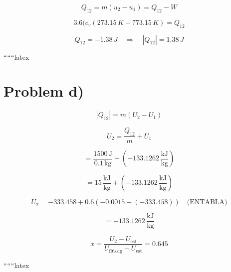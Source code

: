 \[
Q_{12} = m (u_2 - u_1) = Q_{12} - W
\]

\[
3.6 (c_v (273.15\,K - 773.15\,K) = Q_{12}
\]

\[
Q_{12} = -1.38\,J \quad \Rightarrow \quad |Q_{12}| = 1.38\,J
\]

``````latex


\section*{Problem d)}

\begin{equation*}
|Q_{12}| = m (U_2 - U_1)
\end{equation*}

\begin{equation*}
U_2 = \frac{Q_{12}}{m} + U_1
\end{equation*}

\begin{equation*}
= \frac{1500 \, \text{J}}{0.1 \, \text{kg}} + (-133.1262 \, \frac{\text{kJ}}{\text{kg}})
\end{equation*}

\begin{equation*}
= 15 \, \frac{\text{kJ}}{\text{kg}} + (-133.1262 \, \frac{\text{kJ}}{\text{kg}})
\end{equation*}

\begin{equation*}
U_2 = -333.458 + 0.6 \left( -0.0015 - (-333.458) \right) \quad \text{(ENTABLA)}
\end{equation*}

\begin{equation*}
= -133.1262 \, \frac{\text{kJ}}{\text{kg}}
\end{equation*}


\begin{equation*}
x = \frac{U_2 - U_{\text{est}}}{U_{\text{flüssig}} - U_{\text{est}}} = 0.645
\end{equation*}

``````latex


